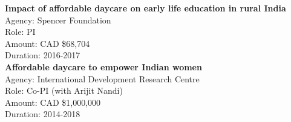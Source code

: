 \documentclass[
  letterpaper,
  DIV=11,
  numbers=noendperiod]{scrartcl}
\begin{document}
\textbf{Impact of affordable daycare on early life education in rural
India}\\
\hspace*{0.333em}\hspace*{0.333em}\hspace*{0.333em}\hspace*{0.333em}Agency:
Spencer Foundation\\
\hspace*{0.333em}\hspace*{0.333em}\hspace*{0.333em}\hspace*{0.333em}Role:
PI\\
\hspace*{0.333em}\hspace*{0.333em}\hspace*{0.333em}\hspace*{0.333em}Amount:
CAD \$68,704\\
\hspace*{0.333em}\hspace*{0.333em}\hspace*{0.333em}\hspace*{0.333em}Duration:
2016-2017\\

\textbf{Affordable daycare to empower Indian women}\\
\hspace*{0.333em}\hspace*{0.333em}\hspace*{0.333em}\hspace*{0.333em}Agency:
International Development Research Centre\\
\hspace*{0.333em}\hspace*{0.333em}\hspace*{0.333em}\hspace*{0.333em}Role:
Co-PI (with Arijit Nandi)\\
\hspace*{0.333em}\hspace*{0.333em}\hspace*{0.333em}\hspace*{0.333em}Amount:
CAD \$1,000,000\\
\hspace*{0.333em}\hspace*{0.333em}\hspace*{0.333em}\hspace*{0.333em}Duration:
2014-2018\\
\end{document}
